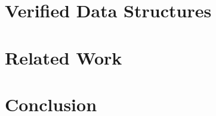 \documentclass[a4paper,UKenglish,cleveref, autoref, thm-restate]{lipics-v2021}
\begin{document}
\section{Verified Data Structures}

\section{Related Work}

\section{Conclusion}







\end{document}
